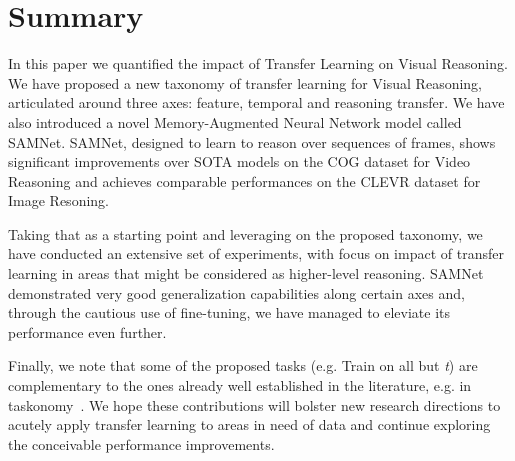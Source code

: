 \section{Summary}


In this paper we quantified the impact of Transfer Learning on Visual Reasoning. 
We have proposed a new taxonomy of transfer learning for Visual Reasoning, articulated around three axes: feature, temporal and reasoning transfer. 
We have also introduced a novel Memory-Augmented Neural Network model called SAMNet.
SAMNet, designed to learn to reason over sequences of frames, shows significant improvements over SOTA models on the COG dataset for Video Reasoning  and achieves comparable performances on the CLEVR dataset for Image Resoning.

Taking that as a starting point and leveraging on the proposed taxonomy, we  have conducted an extensive set of experiments, with focus on impact of transfer learning in areas that might be considered as higher-level reasoning.
SAMNet demonstrated very good generalization capabilities along certain axes and, through the cautious use of fine-tuning, we have managed to eleviate its performance even further.

Finally, we note that some of the proposed tasks (e.g. Train on all but \textit{t}) are complementary to the ones already well established in the literature, e.g. in taskonomy~\cite{zamir2018taskonomy}.
We hope these contributions will bolster new research directions to acutely apply transfer learning to areas in need of data and continue exploring the conceivable performance improvements.

